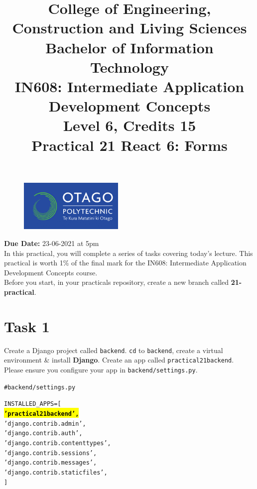 \documentclass{article}
\author{}
\begin{document}
\begin{figure}
	\centering
	\includegraphics[width=50mm]{img/logo.png}
\end{figure}

\title{College of Engineering, Construction and Living Sciences\\Bachelor of Information Technology\\IN608: Intermediate Application Development Concepts\\Level 6, Credits 15\\\textbf{Practical 21 React 6: Forms}} 
\date{}
\maketitle

\textbf{Due Date:} 23-06-2021 at 5pm \\

In this practical, you will complete a series of tasks covering today's lecture. This practical is worth 1\% of the final mark for the IN608: Intermediate Application Development Concepts course. \\

Before you start, in your practicals repository, create a new branch called \textbf{21-practical}. \\

\section*{Task 1} 
Create a Django project called \texttt{backend}. \texttt{cd} to \texttt{backend}, create a virtual environment \& install \textbf{Django}. Create an app called \texttt{practical21backend}. Please ensure you configure your app in \texttt{backend/settings.py}.

\begin{alltt}
  # backend/settings.py

  INSTALLED_APPS = [
      \hl{\textbf{'practical21backend',}} 
      'django.contrib.admin',
      'django.contrib.auth',
      'django.contrib.contenttypes',
      'django.contrib.sessions',
      'django.contrib.messages',
      'django.contrib.staticfiles',
  ]
\end{alltt}
\end{document}
